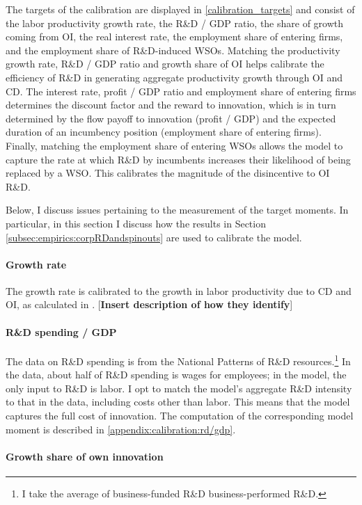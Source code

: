 \documentclass[11pt,english]{article}
\begin{document}
The targets of the calibration are displayed in \autoref{calibration_targets} and consist of the labor productivity growth rate, the R\&D / GDP ratio, the share of growth coming from OI, the real interest rate, the employment share of entering firms, and the employment share of R\&D-induced WSOs. Matching the productivity growth rate, R\&D / GDP ratio and growth share of OI helps calibrate the efficiency of R\&D in generating aggregate productivity growth through OI and CD. The interest rate, profit / GDP ratio and employment share of entering firms determines the discount factor and the reward to innovation, which is in turn determined by the flow payoff to innovation (profit / GDP) and the expected duration of an incumbency position (employment share of entering firms). Finally, matching the employment share of entering WSOs allows the model to capture the rate at which R\&D by incumbents increases their likelihood of being replaced by a WSO. This calibrates the magnitude of the disincentive to OI R\&D.

Below, I discuss issues pertaining to the measurement of the target moments. In particular, in this section I discuss how the results in Section \ref{subsec:empirics:corpRDandspinouts} are used to calibrate the model.

\paragraph{Growth rate}

The growth rate is calibrated to the growth in labor productivity due to CD and OI, as calculated in \cite{klenow_innovative_2020}. [\textbf{Insert description of how they identify}]

\paragraph{R\&D spending / GDP}

The data on R\&D spending is from the National Patterns of R\&D resources.\footnote{I take the average of business-funded R\&D business-performed R\&D.} In the data, about half of R\&D spending is wages for employees; in the model, the only input to R\&D is labor. I opt to match the model's aggregate R\&D intensity to that in the data, including costs other than labor. This means that the model captures the full cost of innovation. The computation of the corresponding model moment is described in \ref{appendix:calibration:rd/gdp}.

\paragraph{Growth share of own innovation}
\end{document}
